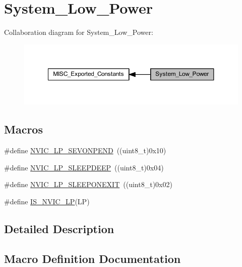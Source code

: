 \hypertarget{group___system___low___power}{}\section{System\+\_\+\+Low\+\_\+\+Power}
\label{group___system___low___power}
Collaboration diagram for System\+\_\+\+Low\+\_\+\+Power\+:
\nopagebreak
\begin{figure}[H]
\begin{center}
\leavevmode
\includegraphics[width=350pt]{group___system___low___power}
\end{center}
\end{figure}
\subsection*{Macros}
\begin{DoxyCompactItemize}
\item 
\#define \hyperlink{group___system___low___power_ga10748d2b2875afd122f6476864ad6cae}{N\+V\+I\+C\+\_\+\+L\+P\+\_\+\+S\+E\+V\+O\+N\+P\+E\+ND}~((uint8\+\_\+t)0x10)
\item 
\#define \hyperlink{group___system___low___power_gaeec2d10922fa9ec5e65398667b303253}{N\+V\+I\+C\+\_\+\+L\+P\+\_\+\+S\+L\+E\+E\+P\+D\+E\+EP}~((uint8\+\_\+t)0x04)
\item 
\#define \hyperlink{group___system___low___power_ga368dc13a9c762a307c07cfa2e3ef59ad}{N\+V\+I\+C\+\_\+\+L\+P\+\_\+\+S\+L\+E\+E\+P\+O\+N\+E\+X\+IT}~((uint8\+\_\+t)0x02)
\item 
\#define \hyperlink{group___system___low___power_ga985896f03bc1d7b3da17a212f1bc3de9}{I\+S\+\_\+\+N\+V\+I\+C\+\_\+\+LP}(LP)
\end{DoxyCompactItemize}


\subsection{Detailed Description}


\subsection{Macro Definition Documentation}
\mbox{\label{group___system___low___power_ga985896f03bc1d7b3da17a212f1bc3de9}} 
